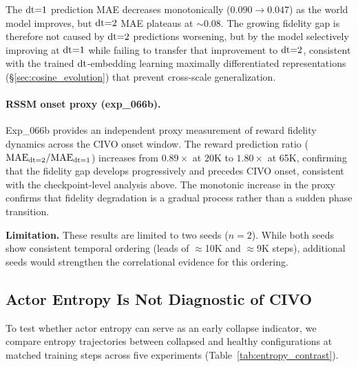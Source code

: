
The $\mathrm{dt}{=}1$ prediction MAE decreases monotonically ($0.090 \to 0.047$) as the world model improves, but $\mathrm{dt}{=}2$ MAE plateaus at ${\sim}0.08$. The growing fidelity gap is therefore not caused by $\mathrm{dt}{=}2$ predictions worsening, but by the model selectively improving at $\mathrm{dt}{=}1$ while failing to transfer that improvement to $\mathrm{dt}{=}2$, consistent with the trained $\mathrm{dt}$-embedding learning maximally differentiated representations (\S\ref{sec:cosine_evolution}) that prevent cross-scale generalization.

\paragraph{RSSM onset proxy (exp\_066b).}
Exp\_066b provides an independent proxy measurement of reward fidelity dynamics across the CIVO onset window. The reward prediction ratio ($\text{MAE}_{\mathrm{dt}{=}2}/\text{MAE}_{\mathrm{dt}{=}1}$) increases from $0.89\times$ at 20K to $1.80\times$ at 65K, confirming that the fidelity gap develops progressively and precedes CIVO onset, consistent with the checkpoint-level analysis above. The monotonic increase in the proxy confirms that fidelity degradation is a gradual process rather than a sudden phase transition.

\textbf{Limitation.} These results are limited to two seeds ($n{=}2$). While both seeds show consistent temporal ordering (leads of ${\approx}$10K and ${\approx}$9K steps), additional seeds would strengthen the correlational evidence for this ordering.

\subsection{Actor Entropy Is Not Diagnostic of CIVO}
\label{sec:entropy_not_diagnostic}

To test whether actor entropy can serve as an early collapse indicator, we compare entropy trajectories between collapsed and healthy configurations at matched training steps across five experiments (Table~\ref{tab:entropy_contrast}).

